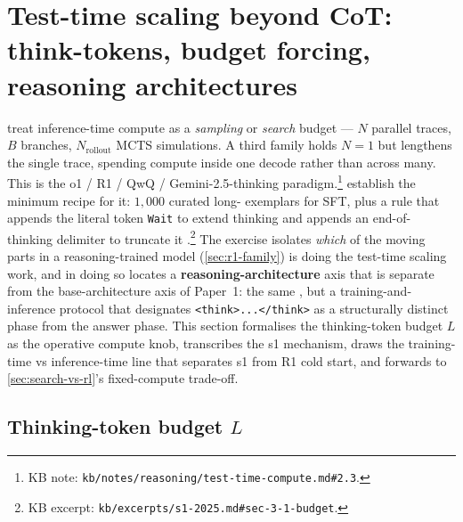 
\section{Test-time scaling beyond CoT: think-tokens, budget forcing, reasoning architectures}
\label{sec:budget-forcing}

 treat inference-time
compute as a \emph{sampling} or \emph{search} budget --- $N$ parallel
traces, $B$ branches, $N_\text{rollout}$ MCTS simulations. A third
family holds $N = 1$ but lengthens the single trace, spending compute
inside one  decode rather than across many. This is the
o1 / R1 / QwQ / Gemini-2.5-thinking
paradigm.\footnote{KB note: \nolinkurl{kb/notes/reasoning/test-time-compute.md#2.3}.}
\citet{s1-2025} establish the minimum recipe for it: $1{,}000$
curated long- exemplars for SFT, plus a \textbf{} rule
that appends the literal token \texttt{Wait} to extend thinking and
appends an end-of-thinking delimiter to truncate it
\citep[\S 3.1]{s1-2025}.\footnote{KB excerpt:
\nolinkurl{kb/excerpts/s1-2025.md#sec-3-1-budget}.} The exercise isolates
\emph{which} of the moving parts in a reasoning-trained model
(\cref{sec:r1-family}) is doing the test-time scaling work, and in
doing so locates a \textbf{reasoning-architecture} axis that is
separate from the base-architecture axis of Paper~1: the same
, but a training-and-inference protocol that designates
\texttt{<think>...</think>} as a structurally distinct phase from the
answer phase. This section formalises the thinking-token budget $L$ as
the operative compute knob, transcribes the s1 mechanism, draws the
training-time vs inference-time line that separates s1 from R1 cold
start, and forwards to \cref{sec:search-vs-rl}'s fixed-compute
trade-off.

\subsection{Thinking-token budget $L$}
\label{sec:budget-knob}

